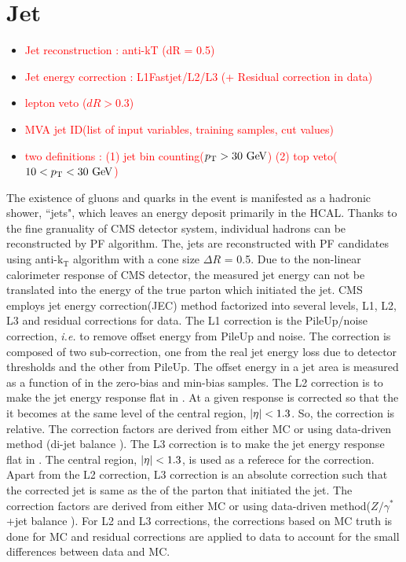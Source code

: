 \section{ Jet }
\begin{itemize}
\item \textcolor{red}{Jet reconstruction : anti-kT (dR = 0.5) }
\item \textcolor{red}{Jet energy correction : L1Fastjet/L2/L3 (+ Residual correction in data) }
\item \textcolor{red}{lepton veto ($dR>0.3$) }
\item \textcolor{red}{MVA jet ID(list of input variables, training samples, cut values)}
\item \textcolor{red}{two definitions : (1) jet bin counting($p_\mathrm{T}>30~\mathrm{Ge\kern -0.1em V}$) (2) top veto($10<p_\mathrm{T}<30~\mathrm{Ge\kern -0.1em V}$) }
\end{itemize}

The existence of gluons and quarks in the event is manifested as a hadronic shower, 
``jets", which leaves an energy deposit primarily in the HCAL. 
Thanks to the fine granuality of CMS detector system, individual hadrons can 
be reconstructed by PF algorithm. 
The, jets are reconstructed with PF candidates using anti-$\textrm{k}_\textrm{T}$ algorithm \cite{}
with a cone size $\Delta R$ = 0.5. Due to the non-linear calorimeter response of CMS detector, 
the measured jet energy can not be translated into the energy of the true parton which 
initiated the jet. CMS employs jet energy correction(JEC) method \cite{} factorized into 
several levels, L1, L2, L3 and residual corrections for data. 
The L1 correction is the PileUp/noise correction, \textit{i.e.} to remove offset energy 
from PileUp and noise. The correction is composed of two sub-correction, 
one from the real jet energy loss due to detector thresholds and 
the other from PileUp. The offset energy in a jet area is measured as a function 
of \Eta{} in the zero-bias and min-bias samples.    
The L2 correction is to make the jet energy response flat in \Eta.  
At a given \Eta{} response is corrected so that the it becomes at the same level 
of the central region, $|\eta|<1.3$. So, the correction is relative. 
The correction factors are derived from either MC or using data-driven method
(di-jet balance \cite{}).
The L3 correction is to make the jet energy response flat in \pt.  
The central region, $|\eta|<1.3$, is used as a referece for the correction. 
Apart from the L2 correction, L3 correction is an absolute correction 
such that the corrected jet \pt{} is same as the \pt{} of the parton that 
initiated the jet. The correction factors are derived from either MC 
or using data-driven method($Z/\gamma^*$+jet balance \cite{}). 
For L2 and L3 corrections, the corrections based on MC truth is done for MC 
and residual corrections are applied to data to account for the small differences 
between data and MC. 

